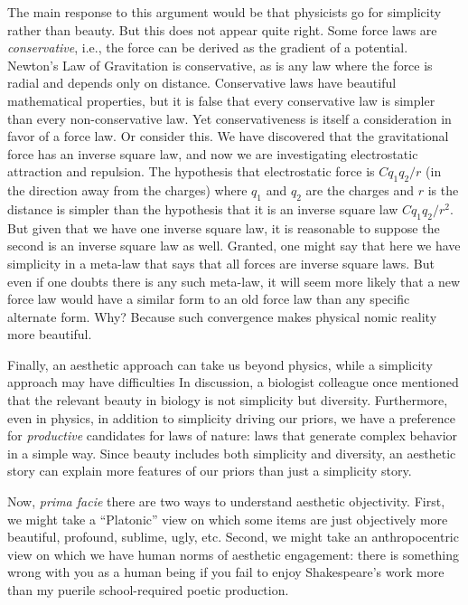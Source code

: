 The main response to this argument would be that physicists go for simplicity~\parencite{ChenSimplicity} rather than beauty.
But this
does not appear quite right. Some force laws are \textit{conservative}, i.e., the force can be derived as 
the gradient of a potential. Newton's Law of Gravitation is conservative, as is any law where the force
is radial and depends only on distance. Conservative laws have beautiful mathematical properties, but it is
false that every conservative law is simpler than every non-conservative law. Yet conservativeness is itself
a consideration in favor of a force law. Or consider this. We have discovered that the gravitational force 
has an inverse square law, and now we are investigating electrostatic attraction and repulsion. The hypothesis
that electrostatic force is $Cq_1q_2/r$ (in the direction away from the charges) where $q_1$ and $q_2$ are the charges and
$r$ is the distance is simpler than the hypothesis that it is an inverse square law $Cq_1q_2/r^2$. But given that 
we have one inverse square law, it is reasonable to suppose the second is an inverse square law as well. Granted,
one might say that here we have simplicity in a meta-law that says that all forces are inverse square laws. But 
even if one doubts there is any such meta-law, it will seem more likely that a new force law would have a similar
form to an old force law than any specific alternate form. Why? Because such convergence makes physical nomic reality 
more beautiful.

Finally, an aesthetic approach can take us beyond physics, while a simplicity approach may have difficulties
In discussion, a biologist colleague once mentioned that the relevant beauty in biology is not simplicity but diversity.
Furthermore, even in physics, in addition to simplicity driving our priors, we have a preference for 
\textit{productive} candidates for laws of nature: laws that generate complex behavior in a simple way.
Since beauty includes both simplicity and diversity, an aesthetic story can explain more features of our
priors than just a simplicity story.

Now, \textit{prima facie} there are two ways to understand aesthetic objectivity. First, we might take a 
``Platonic'' view on which some items are just objectively more beautiful,
profound, sublime, ugly, etc. Second, we might take an anthropocentric view on which we have human 
norms of aesthetic engagement: there is something wrong with you as a human being if you fail to enjoy 
Shakespeare's work more than my puerile school-required poetic production. 

